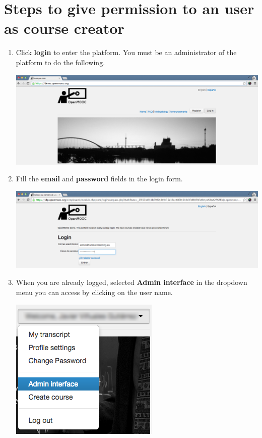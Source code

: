 \documentclass[letterpaper,10pt,english]{sphinxmanual}
\begin{document}
\section{Steps to give permission to an user as course creator}
\label{permission_to_create_a_course:steps-to-give-permission-to-an-user-as-course-creator}\begin{enumerate}
\item {} 
Click \textbf{login} to enter the platform. You must be an administrator of the platform to do the following.

\includegraphics{0_permission_to_create_a_course-1.png}

\item {} 
Fill the \textbf{email} and \textbf{password} fields in the login form.

\includegraphics{0_permission_to_create_a_course-2.png}

\item {} 
When you are already logged, selected \textbf{Admin interface} in the dropdown menu you can access by clicking on the user name.

\includegraphics{0_permission_to_create_a_course-3.png}


\end{enumerate}
\end{document}
